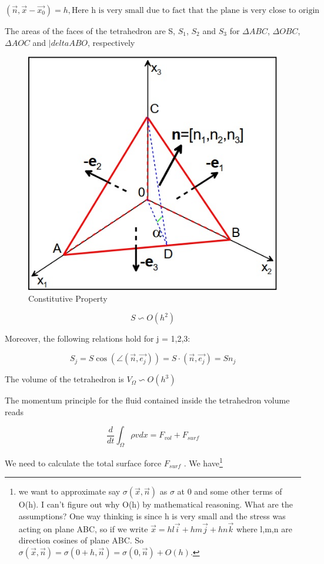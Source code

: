 \documentclass{article}
\begin{document}
{$$(\overrightarrow{n},\overrightarrow{x}-\overrightarrow{x_{0}}) = h, \text{Here h is very small due to fact that the plane is very close to origin}$$

The areas of the faces of the tetrahedron are S, $S_1$, $S_2$ and $S_3$ for $\Delta ABC$, $\Delta OBC$, $\Delta AOC$ and $|delta ABO$, respectively

\begin{figure}[h!]
\centering
\includegraphics[scale=.4]{Constitutive Property.jpg}
\caption{Constitutive Property}
\label{fig:Consti_prop}
\end{figure}

$$S\backsim O(h^{2})$$ 

Moreover, the following relations hold for j = 1,2,3:

$$S_{j} = S\cos(\angle(\overrightarrow{n},\overrightarrow{e_{j}})) = S\cdot (\overrightarrow{n},\overrightarrow{e_{j}}) = Sn_{j}$$

The volume of the tetrahedron is $V_{\Omega}\backsim O(h^{3})$

The momentum principle for the fluid contained inside the tetrahedron volume reads

$$\frac{d}{dt}\int_{\Omega}\rho vdx = F_{vol} + F_{surf}$$

We need to calculate the total surface force $F_{surf}$ . We have\footnote{we want to approximate say $\sigma(\overrightarrow{x},\overrightarrow{n})$ as $\sigma$ at 0 and some other terms of O(h). I can't figure out why O(h) by mathematical reasoning. What are the assumptions? One way thinking is since h is very small and the stress was acting on plane ABC, so if we write $\overrightarrow{x} = hl\overrightarrow{i} + hm\overrightarrow{j} + hn\overrightarrow{k}$ where l,m,n are direction cosines of plane ABC. So $\sigma(\overrightarrow{x},\overrightarrow{n}) = \sigma(0+h,\overrightarrow{n}) = \sigma(0,\overrightarrow{n}) + O(h).$}

}
\end{document}
